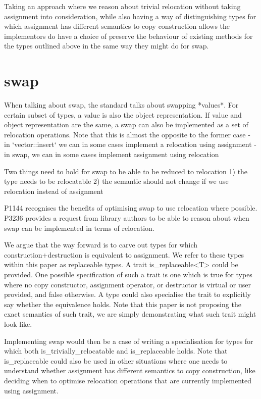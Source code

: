 \documentclass{wg21}
\begin{document}
Taking an approach where we reason about trivial relocation without taking assignment into consideration, while also having a way of distinguishing types for which assignment has different semantics to copy construction allows the implementors do have a choice of preserve the behaviour of existing methods for the types outlined above in the same way they might do for swap.

\section{swap}

When talking about swap, the standard talks about swapping *values*. For certain subset of types, a value is also the object representation. If value and object representation are the same, a swap can also be implemented as a set of relocation operations. Note that this is almost the opposite to the former case
- in `vector::insert` we can in some cases implement a relocation using assignment
- in swap, we can in some cases implement assignment using relocation


Two things need to hold for swap to be able to be reduced to relocation
1) the type needs to be relocatable
2) the semantic should not change if we use relocation instead of assignment

P1144 recognises the benefits of optimising swap to use relocation where possible. P3236 provides a request from library authors to be able to reason about when swap can be implemented in terms of relocation.

We argue that the way forward is to carve out types for which construction+destruction is equivalent to assignment. We refer to these types within this paper as replaceable types. A trait is_replaceable<T> could be provided. One possible specification of such a trait is one which is true for types where no copy constructor, assignment operator, or destructor is virtual or user provided, and false otherwise. A type could also specialise the trait to explicitly say whether the equivalence holds. Note that this paper is not proposing the exact semantics of such trait, we are simply demonstrating what such trait might look like.

Implementing swap would then be a case of writing a specialisation for types for which both is_trivially_relocatable and is_replaceable holds. Note that is_replaceable could also be used in other situations where one needs to understand whether assignment has different semantics to copy construction, like deciding when to optimise relocation operations that are currently implemented using assignment. 
\end{document}
